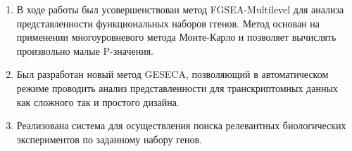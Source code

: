 \begin{enumerate}
  \item В ходе работы был усовершенствован метод FGSEA-Multilevel для анализа представленности функциональных наборов ггенов. Метод основан на применении многоуровневого метода Монте-Карло и позволяет вычислять произвольно малые P-значения.
  \item Был разработан новый метод GESECA, позволяющий в автоматическом режиме проводить анализ представленности для транскриптомных данных как сложного так и простого дизайна.
  \item Реализована система для осуществления поиска релевантных биологических экспериментов по заданному набору генов.
\end{enumerate}
